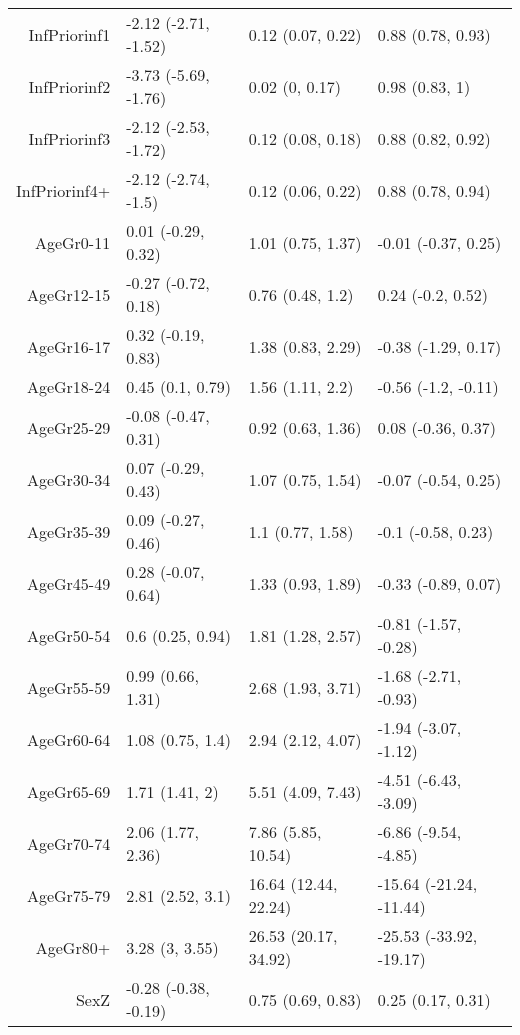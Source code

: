 \begin{table}[ht]
\begin{tabular}{rlll}
  InfPriorinf1 & -2.12 (-2.71, -1.52) & 0.12 (0.07, 0.22) & 0.88 (0.78, 0.93) \\ 
  InfPriorinf2 & -3.73 (-5.69, -1.76) & 0.02 (0, 0.17) & 0.98 (0.83, 1) \\ 
  InfPriorinf3 & -2.12 (-2.53, -1.72) & 0.12 (0.08, 0.18) & 0.88 (0.82, 0.92) \\ 
  InfPriorinf4+ & -2.12 (-2.74, -1.5) & 0.12 (0.06, 0.22) & 0.88 (0.78, 0.94) \\ 
  AgeGr0-11 & 0.01 (-0.29, 0.32) & 1.01 (0.75, 1.37) & -0.01 (-0.37, 0.25) \\ 
  AgeGr12-15 & -0.27 (-0.72, 0.18) & 0.76 (0.48, 1.2) & 0.24 (-0.2, 0.52) \\ 
  AgeGr16-17 & 0.32 (-0.19, 0.83) & 1.38 (0.83, 2.29) & -0.38 (-1.29, 0.17) \\ 
  AgeGr18-24 & 0.45 (0.1, 0.79) & 1.56 (1.11, 2.2) & -0.56 (-1.2, -0.11) \\ 
  AgeGr25-29 & -0.08 (-0.47, 0.31) & 0.92 (0.63, 1.36) & 0.08 (-0.36, 0.37) \\ 
  AgeGr30-34 & 0.07 (-0.29, 0.43) & 1.07 (0.75, 1.54) & -0.07 (-0.54, 0.25) \\ 
  AgeGr35-39 & 0.09 (-0.27, 0.46) & 1.1 (0.77, 1.58) & -0.1 (-0.58, 0.23) \\ 
  AgeGr45-49 & 0.28 (-0.07, 0.64) & 1.33 (0.93, 1.89) & -0.33 (-0.89, 0.07) \\ 
  AgeGr50-54 & 0.6 (0.25, 0.94) & 1.81 (1.28, 2.57) & -0.81 (-1.57, -0.28) \\ 
  AgeGr55-59 & 0.99 (0.66, 1.31) & 2.68 (1.93, 3.71) & -1.68 (-2.71, -0.93) \\ 
  AgeGr60-64 & 1.08 (0.75, 1.4) & 2.94 (2.12, 4.07) & -1.94 (-3.07, -1.12) \\ 
  AgeGr65-69 & 1.71 (1.41, 2) & 5.51 (4.09, 7.43) & -4.51 (-6.43, -3.09) \\ 
  AgeGr70-74 & 2.06 (1.77, 2.36) & 7.86 (5.85, 10.54) & -6.86 (-9.54, -4.85) \\ 
  AgeGr75-79 & 2.81 (2.52, 3.1) & 16.64 (12.44, 22.24) & -15.64 (-21.24, -11.44) \\ 
  AgeGr80+ & 3.28 (3, 3.55) & 26.53 (20.17, 34.92) & -25.53 (-33.92, -19.17) \\ 
  SexZ & -0.28 (-0.38, -0.19) & 0.75 (0.69, 0.83) & 0.25 (0.17, 0.31) \\ 
   \hline
\end{tabular}
\end{table}

